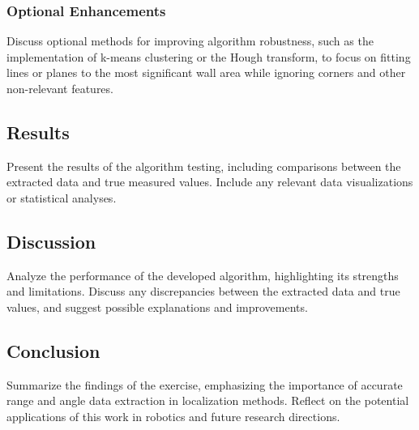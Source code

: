 \documentclass[12pt,a4paper]{article}
\begin{document}
	\subsubsection{Optional Enhancements}
	Discuss optional methods for improving algorithm robustness, such as the implementation of k-means clustering or the Hough transform, to focus on fitting lines or planes to the most significant wall area while ignoring corners and other non-relevant features.
	
	\subsection{Results}
	Present the results of the algorithm testing, including comparisons between the extracted data and true measured values. Include any relevant data visualizations or statistical analyses.
	
	\subsection{Discussion}
	Analyze the performance of the developed algorithm, highlighting its strengths and limitations. Discuss any discrepancies between the extracted data and true values, and suggest possible explanations and improvements.
	
	\subsection{Conclusion}
	Summarize the findings of the exercise, emphasizing the importance of accurate range and angle data extraction in localization methods. Reflect on the potential applications of this work in robotics and future research directions.
	
\end{document}

